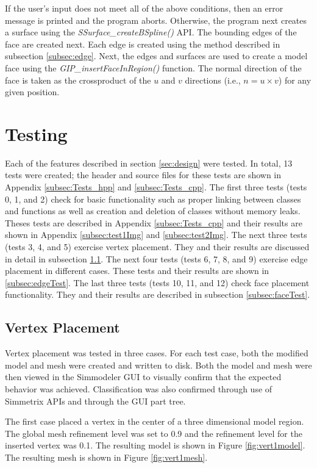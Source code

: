 \documentclass[a4paper, 12pt]{article}
\begin{document}
If the user's input does not meet all of the above conditions, then
an error message is printed and the program aborts. Otherwise, 
the program next creates a surface using the 
\emph{SSurface\_createBSpline()} 
API. The bounding edges of the face are created next. 
Each edge is created using the method described in 
subsection \ref{subsec:edge}. Next, the edges and surfaces are used to 
create a model face using the \emph{GIP\_insertFaceInRegion()} function. 
The normal direction of the face is taken as the crossproduct of 
the $u$ and $v$ directions (i.e., $n=u\times v$) for any given position. 

\section{Testing} \label{sec:testing}
Each of the features described in section \ref{sec:design} were
tested. In total, 13 tests were created; the header and
source files for these tests are shown in 
Appendix \ref{subsec:Tests_hpp} and \ref{subsec:Tests_cpp}. The first three
tests (tests 0, 1, and 2) check for basic functionality 
such as proper linking 
between classes and functions as well as creation and deletion of classes 
without memory leaks. Theses tests are described in 
Appendix \ref{subsec:Tests_cpp}
and their results are shown in Appendix \ref{subsec:test1Img} 
and \ref{subsec:test2Img}. The next three tests (tests 3, 4, and 5) 
exercise vertex placement. They and their results are discussed in detail
in subsection \ref{subsec:vertexTest}. 
The next four tests (tests 6, 7, 8, and 9)
exercise edge placement in different cases. These tests and their results 
are shown in \ref{subsec:edgeTest}. The last three 
tests (tests 10, 11, and 12)
check face placement functionality. They and their results are described in 
subsection \ref{subsec:faceTest}.

\subsection{Vertex Placement} \label{subsec:vertexTest}
Vertex placement was tested in three cases. For each test case, both
the modified model and mesh were created and written to disk. Both 
the model and mesh were then viewed in the Simmodeler GUI 
to visually confirm
that the expected behavior was achieved. Classification was also confirmed
through use of Simmetrix APIs and through the GUI part tree. 

The first case placed a vertex in the center of a three dimensional
model region. The global mesh refinement level was set to 0.9 and the 
refinement level for the inserted vertex was 0.1.
The resulting model is shown in Figure \ref{fig:vert1model}.
The resulting mesh is shown in Figure \ref{fig:vert1mesh}.
\end{document}
